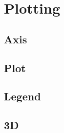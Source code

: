 \section{Plotting}


\subsection*{Axis}




\subsection*{Plot}



\subsection*{Legend}




\subsection*{3D}





